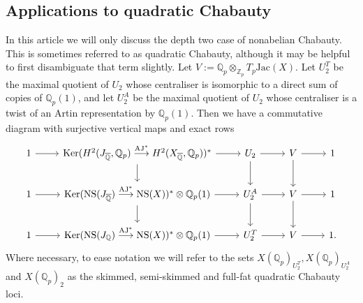 \documentclass[11pt]{amsart}
\def\Z{\mathbb Z}
\def\Q{\mathbb Q}
\newcommand{\AJ}{\mathrm{AJ}}
\theoremstyle{plain}
\theoremstyle{definition}
\newcommand{\Jac}{\mathrm{Jac}}
\newcommand{\NS}{\mathrm{NS}}
\newcommand{\Ker}{\mathrm{Ker}}
\begin{document}
\subsection{Applications to quadratic Chabauty}
In this article we will only discuss the depth two case of nonabelian Chabauty. This is sometimes referred to as quadratic Chabauty, although it may be helpful to first disambiguate that term slightly. Let $V:=\Q _p \otimes _{\Z _p }T_p \Jac (X)$. Let $U_2 ^T$ be the maximal quotient of $U_2 $ whose centraliser is isomorphic to a direct sum of copies of $\Q _p (1)$, and let $U_2 ^A$ be the maximal quotient of $U_2 $ whose centraliser is a twist of an Artin representation by $\Q _p (1)$. Then we have a commutative diagram with surjective vertical maps and exact rows
\[
\begin{tikzcd}
1 \arrow[r] & \Ker (H^2 (J_{\overline{\Q }},\Q _p )\stackrel{\AJ ^* }{\longrightarrow }H^2 (X_{\overline{\Q }},\Q _p ))^* \arrow[d] \arrow[r] & U_2 \arrow[d] \arrow[r] & V \arrow[d] \arrow[r] & 1 \\
1 \arrow[r] & \Ker (\NS (J_{\overline{\Q }})\stackrel{\AJ ^* }{\longrightarrow }\NS (X))^* \otimes \Q _p (1)\arrow[d] \arrow[r] & U_2 ^A \arrow[d] \arrow[r] & V \arrow[d] \arrow[r] & 1 \\
1 \arrow[r] & \Ker (\NS (J_{\Q })\stackrel{\AJ ^* }{\longrightarrow }\NS (X))^* \otimes \Q _p (1) \arrow[r]           & U_2 ^T \arrow[r]           & V \arrow[r]           & 1.
\end{tikzcd}
\]
Where necessary, to ease notation we will refer to the sets $X(\Q _p )_{U_2 ^T},X(\Q _p )_{U_2 ^A}$ and $X(\Q _p )_2 $ as the skimmed, semi-skimmed and full-fat quadratic Chabauty loci.
\end{document}
